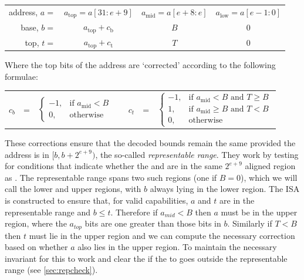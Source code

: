 \begin{center}
{
\renewcommand{\arraystretch}{1.5}
\begin{tabular}{r|c|c|c|}
\cline{2-4}
address, $a =$ & $a_\text{top} = a[31:e+9]$ & $a_\text{mid} = a[e+8:e]$  & $a_\text{low} = a[e-1:0]$ \\ \cline{2-4}
base, $b =$    & $a_\text{top}+c_\text{b}$   & $B $ & $0$ \\ \cline{2-4}
top, $t =$     & $a_\text{top}+c_\text{t}$   & $T $ & $0$ \\ \cline{2-4}
\end{tabular}
}
\end{center}

Where the top bits of the address are `corrected' according to the following formulae:

\begin{center}
\begin{tabular}{r c l p{1em} r c l}
$c_b$ & = & $\begin{cases}
-1, & \text{if } a_\text{mid} < B \\
0,  & \text{otherwise}
\end{cases}$ 
&&
$c_t$ & = & $\begin{cases}
  -1, & \text{if } a_\text{mid} < B \text{ and } T \ge B \\
  1,  & \text{if } a_\text{mid} \ge B \text{ and } T < B \\
  0,  & \text{otherwise}
\end{cases}$
\end{tabular}
\end{center}

These corrections ensure that the decoded bounds remain the same provided the address is in $[b, b + 2^{e+9})$, the so-called \emph{representable range}.
They work by testing for conditions that indicate whether the \ctop{} and \caddress{} are in the same $2^{e+9}$ aligned region as \cbase{}.
The representable range spans two such regions (one if $B = 0$), which we will call the lower and upper regions, with $b$ always lying in the lower region.
The ISA is constructed to ensure that, for valid capabilities, $a$ and $t$ are in the representable range and $b \le t$.
Therefore if $a_{mid} \lt B$ then $a$ must be in the upper region, where the $a_{top}$ bits are one greater than those bits in $b$.
Similarly if $T \lt B$ then $t$ must lie in the upper region and we can compute the necessary correction based on whether $a$ also lies in the upper region.
To maintain the necessary invariant for this to work  and  clear the \ctag{} if the \caddress{} to goes outside the representable range (see \cref{sec:repcheck}).

